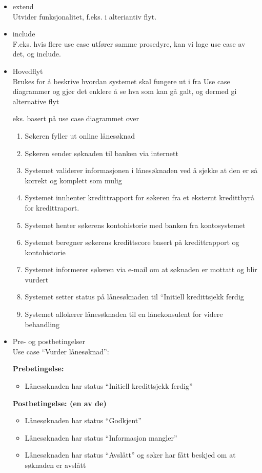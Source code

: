 \documentclass[11pt]{article}
\begin{document}
\begin{itemize}

\item \label{extend}extend\\
\label{sec-7.2.1.1}%
Utvider funksjonalitet, f.eks. i alteriantiv flyt.

\item \label{include}include\\
\label{sec-7.2.1.2}%
F.eks. hvis flere use case utfører samme prosedyre, kan vi lage use case av det, og include.


\item Hovedflyt\\
\label{sec-7.2.1.3}%
Brukes for å beskrive hvordan systemet skal fungere ut i fra Use case diagrammer
     og gjør det enklere å se hva som kan gå galt, og dermed gi alternative flyt

     eks. basert på use case diagrammet over

\begin{enumerate}
\item Søkeren fyller ut online lånesøknad
\item Søkeren sender søknaden til banken via internett
\item Systemet validerer informasjonen i lånesøknaden ved å 
        sjekke at den er så korrekt og komplett som mulig
\item Systemet innhenter kredittrapport for søkeren fra et
        eksternt kredittbyrå for kredittraport.
\item Systemet henter søkerens kontohistorie med banken
        fra kontosystemet
\item Systemet beregner søkerens kredittscore basert på
        kredittrapport og kontohistorie
\item Systemet informerer søkeren via e-mail om at søknaden 
        er mottatt og blir vurdert
\item Systemet setter status på lånesøknaden til ``Initiell
        kredittsjekk ferdig
\item Systemet allokerer lånesøknaden til en lånekonsulent 
        for videre behandling
\end{enumerate}


\item Pre- og postbetingelser\\
\label{sec-7.2.1.4}%
Use case ``Vurder lånesøknad'':

     \textbf{Prebetingelse:}
\begin{itemize}
\item Lånesøknaden har status ``Initiell kredittsjekk ferdig''
\end{itemize}
     \textbf{Postbetingelse: (en av de)}
\begin{itemize}
\item Lånesøknaden har status ``Godkjent''
\item Lånesøknaden har status ``Informasjon mangler''
\item Lånesøknaden har status ``Avslått'' og søker har fått
       beskjed om at søknaden er avslått
\end{itemize}
    
\end{itemize} %
\end{document}
